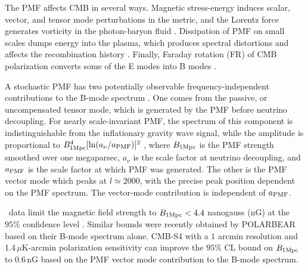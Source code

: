 The PMF affects CMB in several ways. Magnetic stress-energy induces scalar, vector, and tensor mode perturbations in the metric, and the Lorentz force generates vorticity in the photon-baryon fluid \cite{Subramanian:1998fn,Mack:2001gc,Lewis:2004ef,Shaw:2009nf,Paoletti:2010rx}. Dissipation of PMF on small scales dumps energy into the plasma, which produces spectral distortions and affects the recombination history \cite{Kunze:2014eka}.  Finally, Faraday rotation (FR) of CMB polarization converts some of the E modes into B modes \cite{Kosowsky:2004zh,Pogosian:2011qv}.

A stochastic PMF has two potentially observable frequency-independent contributions to the B-mode spectrum \cite{Shaw:2009nf}. One comes from the passive, or uncompensated tensor mode, which is generated by the PMF before neutrino decoupling. For nearly scale-invariant PMF, the spectrum of this component is indistinguishable from the inflationary gravity wave signal, while the amplitude is proportional to $B^4_{1\rm{Mpc}} [\ln(a_\nu / a_{\rm{PMF}})]^2$ \cite{Lewis:2004ef}, where $B_{1\rm{Mpc}}$ is the PMF strength smoothed over one megaparsec, $a_\nu$ is the scale factor at neutrino decoupling, and $a_{\rm{PMF}}$ is the scale factor at which PMF was generated. The other is the PMF vector mode which peaks at $l \simeq 2000$, with the precise peak position dependent on the PMF spectrum. The vector-mode contribution is independent of $a_{\rm{PMF}}$.

\planck\ data limit the magnetic field strength to $B_{1 {\rm Mpc}}<4.4$ nanogauss (nG) at the $95\%$ confidence level \cite{Ade:2015cva}. Similar bounds were recently obtained by POLARBEAR \cite{Ade:2015cao} based on their B-mode spectrum alone. CMB-S4 with a $1$ arcmin resolution and 1.4\,$\mu$K-arcmin polarization sensitivity can improve the $95\%$ CL bound on $B_{1 {\rm Mpc}}$ to 0.6\,nG based on the PMF vector mode contribution to the B-mode spectrum.

